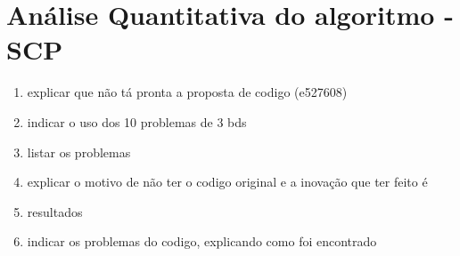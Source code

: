 \section{Análise Quantitativa do algoritmo - SCP}

\begin{enumerate}
\item explicar que não tá pronta a proposta de codigo (e527608)
\item indicar o uso dos 10 problemas de 3 bds
\item listar os problemas
\item explicar o motivo de não ter o codigo original e a inovação que ter feito é
\item resultados
\item indicar os problemas do codigo, explicando como foi encontrado
\end{enumerate}